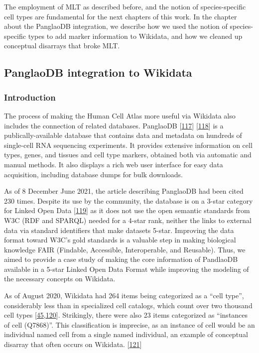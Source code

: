 The employment of MLT as described before, and the notion of species-specific cell types are fundamental for the next chapters of this work.
In the chapter about the PanglaoDB integration, we describe how we used the notion of species-specific types to add marker information to Wikidata, and how we cleaned up conceptual disarrays that broke MLT.

\hypertarget{panglaodb-integration-to-wikidata}{%
\subsection{PanglaoDB integration to Wikidata}\label{panglaodb-integration-to-wikidata}}

\hypertarget{introduction}{%
\subsubsection{Introduction}\label{introduction}}

The process of making the Human Cell Atlas more useful via Wikidata also includes the connection of related databases.
PanglaoDB {[}\protect\hyperlink{ref-M0lqRYJb}{117}{]} {[}\protect\hyperlink{ref-T3PlZ3Vh}{118}{]} is a publically-available database that contains data and metadata on hundreds of single-cell RNA sequencing experiments.
It provides extensive information on cell types, genes, and tissues and cell type markers, obtained both via automatic and manual methods.
It also displays a rich web user interface for easy data acquisition, including database dumps for bulk downloads.

As of 8 December June 2021, the article describing PanglaoDB had been cited 230 times.
Despite its use by the community, the database is on a 3-star category for Linked Open Data {[}\protect\hyperlink{ref-OGXYtGZ8}{119}{]} as it does not use the open semantic standards from W3C (RDF and SPARQL) needed for a 4-star rank, neither the links to external data via standard identifiers that make datasets 5-star.
Improving the data format toward W3C's gold standards is a valuable step in making biological knowledge FAIR (Findable, Accessible, Interoperable, and Reusable).
Thus, we aimed to provide a case study of making the core information of PandlaoDB available in a 5-star Linked Open Data Format while improving the modeling of the necessary concepts on Wikidata.

As of August 2020, Wikidata had 264 items being categorized as a ``cell type'', considerably less than in specialized cell catalogs, which count over two thousand cell types {[}\protect\hyperlink{ref-agnqfdk6}{45},\protect\hyperlink{ref-4AEy2xhQ}{120}{]}.
Strikingly, there were also 23 items categorized as ``instances of cell (Q7868)''. This classification is imprecise, as an instance of cell would be an individual named cell from a single named individual, an example of conceptual disarray that often occurs on Wikidata. {[}\protect\hyperlink{ref-imSZTi52}{121}{]}

